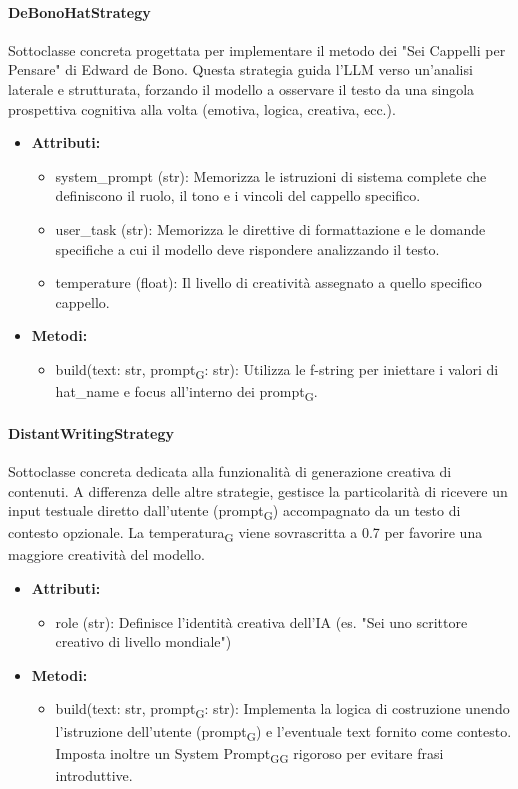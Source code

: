 \documentclass[11pt,a4paper]{article}
\newcommand{\gls}[1]{#1\textsubscript{G}}
\begin{document}
\paragraph{DeBonoHatStrategy}
Sottoclasse concreta progettata per implementare il metodo dei "Sei Cappelli per Pensare" di Edward de Bono. Questa strategia guida l'LLM verso un'analisi laterale e strutturata, forzando il modello a osservare il testo da una singola prospettiva cognitiva alla volta (emotiva, logica, creativa, ecc.).
\begin{itemize}
    \item \textbf{Attributi:}
\begin{itemize}
    \item system\_prompt (str): Memorizza le istruzioni di sistema complete che definiscono il ruolo, il tono e i vincoli del cappello specifico.
    \item user\_task (str): Memorizza le direttive di formattazione e le domande specifiche a cui il modello deve rispondere analizzando il testo.
    \item temperature (float): Il livello di creatività assegnato a quello specifico cappello.
\end{itemize}

\item \textbf{Metodi:}
\begin{itemize}
    \item build(text: str, \gls{prompt}: str): Utilizza le f-string per iniettare i valori di hat\_name e focus all'interno dei \gls{prompt}.
\end{itemize}
\end{itemize}

\paragraph{DistantWritingStrategy}
Sottoclasse concreta dedicata alla funzionalità di generazione creativa di contenuti. A differenza delle altre strategie, gestisce la particolarità di ricevere un input testuale diretto dall'utente (\gls{prompt}) accompagnato da un testo di contesto opzionale. La \gls{temperatura} viene sovrascritta a 0.7 per favorire una maggiore creatività del modello.
\begin{itemize}
    \item \textbf{Attributi:}
    \begin{itemize}
        \item role (str): Definisce l'identità creativa dell'IA (es. "Sei uno scrittore creativo di livello mondiale")
    \end{itemize}
    
    \item \textbf{Metodi:}
    \begin{itemize}
        \item build(text: str, \gls{prompt}: str): Implementa la logica di costruzione unendo l'istruzione dell'utente (\gls{prompt}) e l'eventuale text fornito come contesto. Imposta inoltre un \gls{System \gls{Prompt}} rigoroso per evitare frasi introduttive.
    \end{itemize}
\end{itemize}
\end{document}
